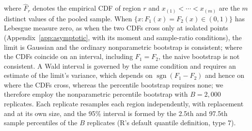 \documentclass[AMA,Times1COL]{WileyNJDv5}
\begin{document}
where $\hat{F}_r$ denotes the empirical CDF of region $r$ and $x_{(1)} < \cdots < x_{(m)}$ are the $m$ distinct values of the pooled sample. When $\{x : F_1(x) = F_2(x) \in (0,1)\}$ has Lebesgue measure zero, as when the two CDFs cross only at isolated points (Appendix~\ref{app:asymptotic}, with its moment and sample-ratio conditions), the limit is Gaussian and the ordinary nonparametric bootstrap is consistent;\cite{fang2019} where the CDFs coincide on an interval, including $F_1 = F_2$, the naive bootstrap is not consistent.\cite{dumbgen1993} A Wald interval is governed by the same condition and requires an estimate of the limit's variance, which depends on $\operatorname{sgn}(F_1 - F_2)$ and hence on where the CDFs cross, whereas the percentile bootstrap requires none; we therefore employ the nonparametric percentile bootstrap\cite{efron1993} with $B = 2{,}000$ replicates. Each replicate resamples each region independently, with replacement and at its own size, and the 95\% interval is formed by the 2.5th and 97.5th sample percentiles of the $B$ replicates (R's default quantile definition, type 7).
\end{document}
